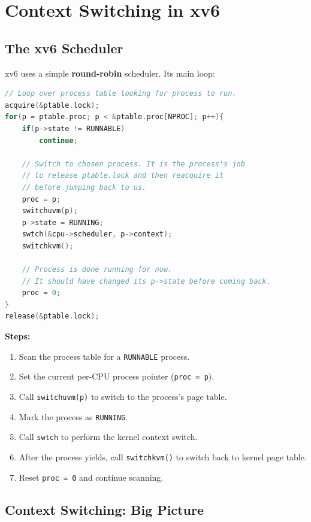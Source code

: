 \documentclass[11pt]{article}
\begin{document}
\section{Context Switching in xv6}

\subsection{The xv6 Scheduler}

xv6 uses a simple \textbf{round-robin} scheduler. Its main loop:

\begin{lstlisting}[language=C, caption={xv6 scheduler (proc.c)}]
// Loop over process table looking for process to run.
acquire(&ptable.lock);
for(p = ptable.proc; p < &ptable.proc[NPROC]; p++){
    if(p->state != RUNNABLE)
        continue;

    // Switch to chosen process. It is the process's job
    // to release ptable.lock and then reacquire it
    // before jumping back to us.
    proc = p;
    switchuvm(p);
    p->state = RUNNING;
    swtch(&cpu->scheduler, p->context);
    switchkvm();

    // Process is done running for now.
    // It should have changed its p->state before coming back.
    proc = 0;
}
release(&ptable.lock);
\end{lstlisting}

\textbf{Steps:}
\begin{enumerate}
    \item Scan the process table for a \texttt{RUNNABLE} process.
    \item Set the current per-CPU process pointer (\texttt{proc = p}).
    \item Call \texttt{switchuvm(p)} to switch to the process's page table.
    \item Mark the process as \texttt{RUNNING}.
    \item Call \texttt{swtch} to perform the kernel context switch.
    \item After the process yields, call \texttt{switchkvm()} to switch back to kernel page table.
    \item Reset \texttt{proc = 0} and continue scanning.
\end{enumerate}

\subsection{Context Switching: Big Picture}
\end{document}
